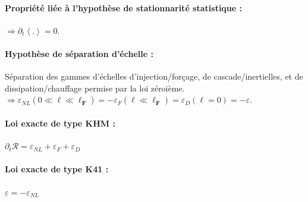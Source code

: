 {\begin{minipage}[c]{\linewidth}
\paragraph{Propriété liée à l'hypothèse de stationnarité statistique : } $\Rightarrow \partial_t \left<.\right> = 0$.

\paragraph{Hypothèse de séparation d'échelle : } Séparation des gammes d'échelles d'injection/forçage, de cascade/inertielles, et de dissipation/chauffage permise par la loi zéroième. $\Rightarrow  \varepsilon_{NL}(0 \ll \boldsymbol{\ell} \ll \boldsymbol{\ell_F} ) = - \varepsilon_{F}(\boldsymbol{\ell} \ll \boldsymbol{\ell_F} ) = \varepsilon_{D}(\boldsymbol{\ell}=0) = - \varepsilon$.

\paragraph{Loi exacte de type \acs{KHM} : } $\partial_t \mathcal{R} = \varepsilon_{NL} + \varepsilon_{F} + \varepsilon_{D}$

\paragraph{Loi exacte de type \acs{K41} : } $\varepsilon = -\varepsilon_{NL}$

\end{minipage}}
